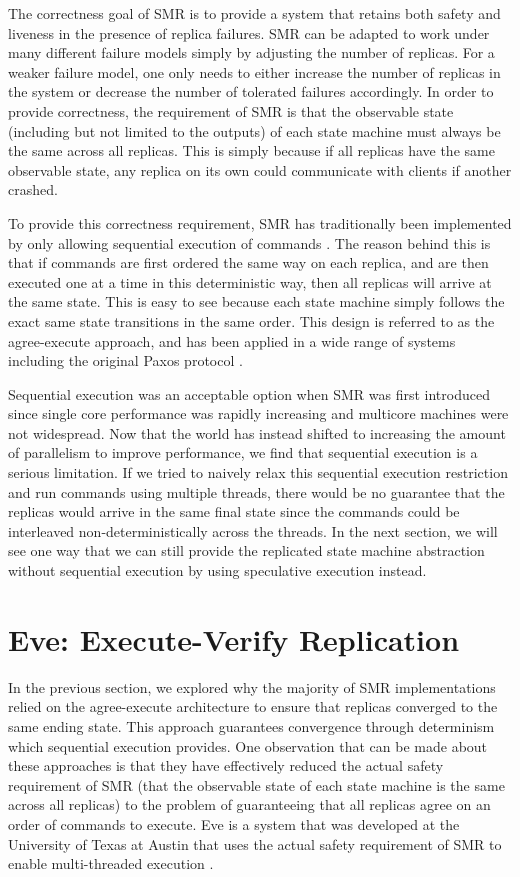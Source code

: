 \documentclass[11pt, oneside]{report}
\begin{document}
The correctness goal of SMR is to provide a system that retains both safety and liveness in the presence of replica failures. 
SMR can be adapted to work under many different failure models simply by adjusting the number of replicas. 
For a weaker failure model, one only needs to either increase the number of replicas in the system or decrease the number of tolerated failures accordingly. 
In order to provide correctness, the requirement of SMR is that the observable state (including but not limited to the outputs) of each state machine must always be the same across all replicas. 
This is simply because if all replicas have the same observable state, any replica on its own could communicate with clients if another crashed.

To provide this correctness requirement, SMR has traditionally been implemented by only allowing sequential execution of commands \cite{schneider, paxos, paxosMadeSimple}. 
The reason behind this is that if commands are first ordered the same way on each replica, and are then executed one at a time in this deterministic way, then all replicas will arrive at the same state. 
This is easy to see because each state machine simply follows the exact same state transitions in the same order. 
This design is referred to as the agree-execute approach, and has been applied in a wide range of systems including the original Paxos protocol \cite{paxos}.

Sequential execution was an acceptable option when SMR was first introduced since single core performance was rapidly increasing and multicore machines were not widespread. 
Now that the world has instead shifted to increasing the amount of parallelism to improve performance, we find that sequential execution is a serious limitation. 
If we tried to naively relax this sequential execution restriction and run commands using multiple threads, there would be no guarantee that the replicas would arrive in the same final state since the commands could be interleaved non-deterministically across the threads. 
In the next section, we will see one way that we can still provide the replicated state machine abstraction without sequential execution by using speculative execution instead. 
 

\section{Eve: Execute-Verify Replication}

In the previous section, we explored why the majority of SMR implementations relied on the agree-execute architecture to ensure that replicas converged to the same ending state. 
This approach guarantees convergence through determinism which sequential execution provides. 
One observation that can be made about these approaches is that they have effectively reduced the actual safety requirement of SMR (that the observable state of each state machine is the same across all replicas) to the problem of guaranteeing that all replicas agree on an order of commands to execute. 
Eve is a system that was developed at the University of Texas at Austin that uses the actual safety requirement of SMR to enable multi-threaded execution \cite{eve, manosThesis}.
\end{document}
